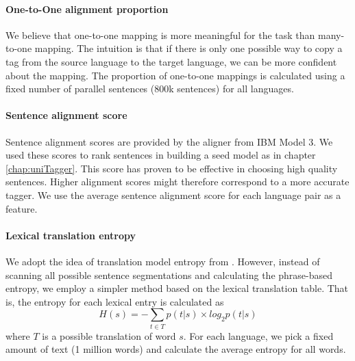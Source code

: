 \paragraph{One-to-One alignment proportion}
We believe that one-to-one mapping is more meaningful for the task than many-to-one mapping. The intuition is that if there is only one possible way to copy a tag from the source language to the target language, we can be more confident about the mapping. The proportion of one-to-one mappings is calculated using a fixed number of parallel sentences (800k sentences) for all languages.  

\paragraph{Sentence alignment score}
Sentence alignment scores are provided by the aligner from IBM Model 3.  We used these scores to rank sentences in building a seed model as in chapter \ref{chap:uniTagger}. This score has proven to be effective in choosing high quality sentences. Higher alignment scores might therefore correspond to a more accurate tagger. We use the average sentence alignment score for each language pair as a feature.




\paragraph{Lexical translation entropy}

We adopt the idea of translation model entropy from \cite{462MTSystem}. However, instead of scanning all possible sentence segmentations and calculating the phrase-based entropy, we employ a simpler method based on the lexical translation table. That is, the entropy for each lexical entry is calculated as $$H(s) = -\sum_{t\in T} p(t|s)\times log_2 p(t|s)$$ where $T$ is a possible translation of word $s$. For each language, we pick a fixed amount of text (1 million words) and calculate the average entropy for all words.  

